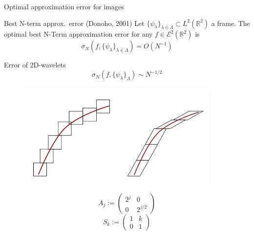 \begin{frame}{Optimal approximation error for images}
\begin{block}{Best N-term approx.\ error (Donoho, 2001)}
Let $\{\psi_{\lambda}\}_{\lambda\in\Lambda}\subset L^2(\mathbb{R}^2)$ a frame. The optimal best N-Term approximation error for any $f\in\mathcal{E}^2(\mathbb{R}^2)$ is
$$
\sigma_N(f,\{\psi_{\lambda}\}_{\lambda\in\Lambda})=O(N^{-1})
$$
\end{block}
\pause
\begin{block}{Error of 2D-wavelets}
$$
\sigma_N(f,\{\psi_{\lambda}\}_{\Lambda})\sim N^{-1/2}
$$
\end{block}
\pause
\begin{minipage}{0.5\textwidth}
\begin{figure}[h!]
\centering
\includegraphics[width=0.9\textwidth]{./Images/anisotropic_isotropic.jpg}
\end{figure}
\end{minipage}\hfill
\begin{minipage}{0.49 \textwidth}
$$
A_j:=
\left(
\begin{matrix}
2^j & 0 \\
0 & 2^{j/2}
\end{matrix}
\right)
$$
\bigskip
$$
S_k:=
\left(
\begin{matrix}
1 & k \\
0 & 1
\end{matrix}
\right)
$$
\end{minipage}
\end{frame}


